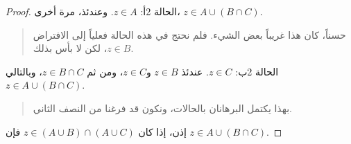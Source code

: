 \documentclass[../../../include/open-logic-section]{subfiles}
\begin{document}
\begin{proof}
الحالة 2أ: $z \in A$. وعندئذ، مرة أخرى،
$z \in A \cup (B \cap C)$.
\begin{quote}
حسناً، كان هذا غريباً بعض الشيء. فلم نحتج في هذه الحالة فعلياً إلى
الافتراض $z \in B$، لكن لا بأس بذلك.
\end{quote}
الحالة 2ب: $z \in C$. عندئذ $z \in B$ و$z \in C$، ومن ثم
$z \in B \cap C$، وبالتالي $z \in A \cup (B \cap C)$.
\begin{quote}
بهذا يكتمل البرهانان بالحالات، ونكون قد فرغنا من النصف الثاني.
\end{quote}
إذن، إذا كان $z \in (A \cup B) \cap (A \cup C)$ فإن
$z \in A \cup (B \cap C)$.
\end{proof}
\end{document}
